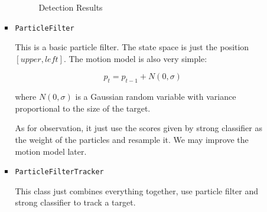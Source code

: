 \documentclass[a4paper]{article}
\begin{document}
\begin{enumerate}
\begin{itemize}
\begin{itemize}
\begin{figure}[htb]
    \begin{center}
    \end{center}
    \caption{Detection Results}
    \label{fig:singlesampler}
\end{figure}

\item \lstinline{ParticleFilter}

This is a basic particle filter. The state space is just the position $[upper, left]$. The motion model is also very simple:

\begin{equation}
p_{t}=p_{t-1}+N(0, \sigma)
\end{equation}

where $N(0, \sigma)$ is a Gaussian random variable with variance proportional to the size of the target.

As for observation, it just use the scores given by strong classifier as the weight of the particles and resample it. We may improve the motion model later.

\item \lstinline{ParticleFilterTracker}

This class just combines everything together, use particle filter and strong classifier to track a target.


\end{itemize}
\end{itemize}
\end{enumerate}
\end{document}
